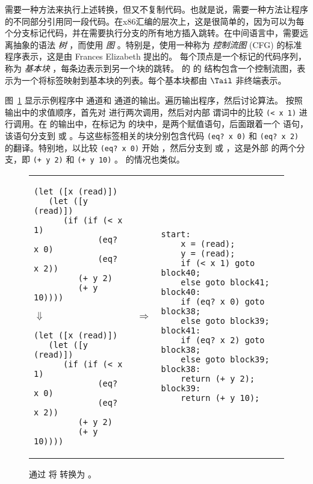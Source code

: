 \documentclass[11pt]{book}
\begin{document}
需要一种方法来执行上述转换，但又不复制代码。也就是说，需要一种方法让程序的不同部分引用同一段代码。在x86汇编的层次上，这是很简单的，因为可以为每个分支标记代码，并在需要执行分支的所有地方插入跳转。在中间语言中，需要远离抽象的语法 \emph{树} ，而使用 \emph{图} 。特别是，使用一种称为
\emph{控制流图} (CFG) 的标准程序表示，这是由 Frances Elizabeth
\citet{Allen:1970uq} 提出的。  每个顶点是一个标记的代码序列，称为 \emph{基本块} ，每条边表示到另一个块的跳转。
\LangCVar{} 的 \LangCIf{} 的  结构包含一个控制流图，表示为一个将标签映射到基本块的列表。每个基本块都由 $\Tail$ 非终端表示。

图~\ref{fig:explicate-control-s1-38} 显示示例程序中
 通道和
 通道的输出。遍历输出程序，然后讨论算法。
%
按照
 输出中的求值顺序，首先对 
进行两次调用，然后对内部  谓词中的比较 \lstinline{(< x 1)} 进行调用。在  的输出中，在标记为  的块中，是两个赋值语句，后面跟着一个
 语句，该语句分支到  或
 。与这些标签相关的块分别包含代码 \lstinline{(eq? x 0)} 和 \lstinline{(eq? x 2)} 的翻译。特别地，以比较 \lstinline{(eq? x 0)}  开始  ，然后分支到  或
 ，这是外部  的两个分支，即
\lstinline{(+ y 2)} 和 \lstinline{(+ y 10)} 。
 的情况也类似。

\begin{figure}[tbp]
\begin{tabular}{lll}
\begin{minipage}{0.4\textwidth}
\begin{lstlisting}
(let ([x (read)])
   (let ([y (read)])
      (if (if (< x 1)
             (eq? x 0)
             (eq? x 2))
         (+ y 2)
         (+ y 10))))
\end{lstlisting}
\hspace{40pt}$\Downarrow$
\begin{lstlisting}
(let ([x (read)])
   (let ([y (read)])
      (if (if (< x 1)
             (eq? x 0)
             (eq? x 2))
         (+ y 2)
         (+ y 10))))
\end{lstlisting}
\end{minipage}
&
$\Rightarrow$
&
\begin{minipage}{0.55\textwidth}
\begin{lstlisting}
start:
    x = (read);
    y = (read);
    if (< x 1) goto block40;
    else goto block41;
block40:
    if (eq? x 0) goto block38;
    else goto block39;
block41:
    if (eq? x 2) goto block38;
    else goto block39;
block38:
    return (+ y 2);
block39:
    return (+ y 10);
\end{lstlisting}
\end{minipage}
\end{tabular} 

\caption{通过  将 \LangIf{} 转换为 \LangCIf{} 。}
\label{fig:explicate-control-s1-38}
\end{figure}
\end{document}

